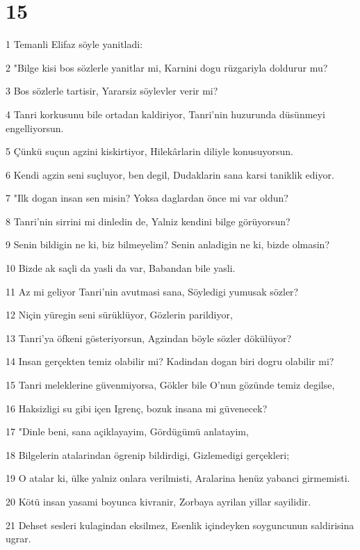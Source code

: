 \chapter{15}

\par 1 Temanli Elifaz söyle yanitladi:
\par 2 "Bilge kisi bos sözlerle yanitlar mi, Karnini dogu rüzgariyla doldurur mu?
\par 3 Bos sözlerle tartisir, Yararsiz söylevler verir mi?
\par 4 Tanri korkusunu bile ortadan kaldiriyor, Tanri'nin huzurunda düsünmeyi engelliyorsun.
\par 5 Çünkü suçun agzini kiskirtiyor, Hilekârlarin diliyle konusuyorsun.
\par 6 Kendi agzin seni suçluyor, ben degil, Dudaklarin sana karsi taniklik ediyor.
\par 7 "Ilk dogan insan sen misin? Yoksa daglardan önce mi var oldun?
\par 8 Tanri'nin sirrini mi dinledin de, Yalniz kendini bilge görüyorsun?
\par 9 Senin bildigin ne ki, biz bilmeyelim? Senin anladigin ne ki, bizde olmasin?
\par 10 Bizde ak saçli da yasli da var, Babandan bile yasli.
\par 11 Az mi geliyor Tanri'nin avutmasi sana, Söyledigi yumusak sözler?
\par 12 Niçin yüregin seni sürüklüyor, Gözlerin parildiyor,
\par 13 Tanri'ya öfkeni gösteriyorsun, Agzindan böyle sözler dökülüyor?
\par 14 Insan gerçekten temiz olabilir mi? Kadindan dogan biri dogru olabilir mi?
\par 15 Tanri meleklerine güvenmiyorsa, Gökler bile O'nun gözünde temiz degilse,
\par 16 Haksizligi su gibi içen Igrenç, bozuk insana mi güvenecek?
\par 17 "Dinle beni, sana açiklayayim, Gördügümü anlatayim,
\par 18 Bilgelerin atalarindan ögrenip bildirdigi, Gizlemedigi gerçekleri;
\par 19 O atalar ki, ülke yalniz onlara verilmisti, Aralarina henüz yabanci girmemisti.
\par 20 Kötü insan yasami boyunca kivranir, Zorbaya ayrilan yillar sayilidir.
\par 21 Dehset sesleri kulagindan eksilmez, Esenlik içindeyken soyguncunun saldirisina ugrar.
